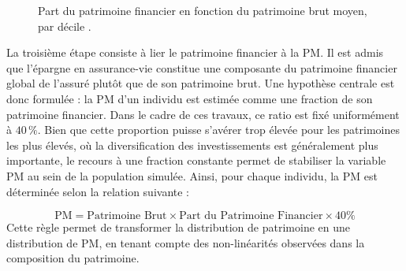 \begin{figure}[H]
    \centering
    \caption{Part du patrimoine financier en fonction du patrimoine brut moyen, par décile \cite{insee_patrimoine_age}.}
    \label{fig:composition_patrimoine}
\end{figure}

La troisième étape consiste à lier le patrimoine financier à la PM. Il est admis que l'épargne en assurance-vie constitue une composante du patrimoine financier global de l'assuré plutôt que de son patrimoine brut. Une hypothèse centrale est donc formulée : la PM d'un individu est estimée comme une fraction de son patrimoine financier. Dans le cadre de ces travaux, ce ratio est fixé uniformément à $40\,\%$. Bien que cette proportion puisse s'avérer trop élevée pour les patrimoines les plus élevés, où la diversification des investissements est généralement plus importante, le recours à une fraction constante permet de stabiliser la variable PM au sein de la population simulée. Ainsi, pour chaque individu, la PM est déterminée selon la relation suivante :

\begin{equation}
 \text{PM} = \text{Patrimoine Brut} \times \text{Part du Patrimoine Financier} \times 40\% 
\end{equation}
Cette règle permet de transformer la distribution de patrimoine en une distribution de PM, en tenant compte des non-linéarités observées dans la composition du patrimoine.

